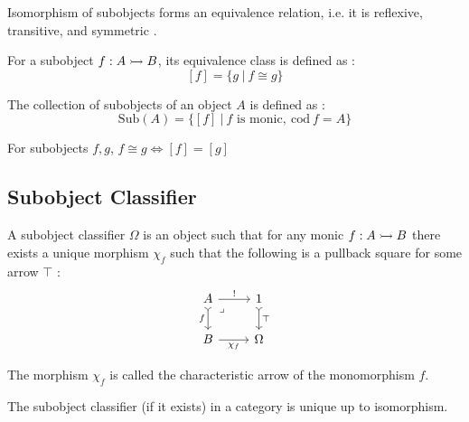\begin{proposition}
  Isomorphism of subobjects forms an equivalence relation, i.e. it is reflexive,
  transitive, and symmetric \parencite[p.~77]{goldblatt:topoi}.
\end{proposition}

\begin{definition}

  For a subobject $f:A\rightarrowtail B$, its equivalence class is defined as
  \parencite[p.~77]{goldblatt:topoi}:
  \[
    [f] = \{g\ |\ f\cong g\}
  \]
\end{definition}

\begin{definition}
  The collection of subobjects of an object $A$ is defined as
  \parencite[p.~77]{goldblatt:topoi}:
  \[
    \mathrm{Sub}(A) = \{[f]\ |\ \text{$f$ is monic},\ \mathrm{cod}\ f = A\}
  \]
\end{definition}

\begin{proposition}
  For subobjects $f,g$, $f\cong g \iff [f] = [g]$
\end{proposition}

\subsection{Subobject Classifier}
\begin{definition}
  A subobject classifier $\Omega$ is an object such that for any monic $f:A\rightarrowtail
  B$ there exists a unique morphism $\chi_f$ such that the following is a
  pullback square for some arrow $\top$ \parencite[p.~84]{goldblatt:topoi}:
  \[\begin{tikzcd}[ampersand replacement=\&]
    A \& 1 \\
    B \& \Omega
    \arrow["{\mathrm{\top}}", tail, from=1-2, to=2-2]
    \arrow["{!}", from=1-1, to=1-2]
    \arrow["f"', tail, from=1-1, to=2-1]
    \arrow["{\chi_f}"', from=2-1, to=2-2]
    \arrow["\lrcorner"{anchor=center, pos=0.125}, draw=none, from=1-1, to=2-2]
  \end{tikzcd}\]
\end{definition}

\begin{remark}
  The morphism $\chi_f$ is called the characteristic arrow of the monomorphism
  $f$.
\end{remark}

\begin{proposition}
  The subobject classifier (if it exists) in a category is unique up to
  isomorphism.
\end{proposition}